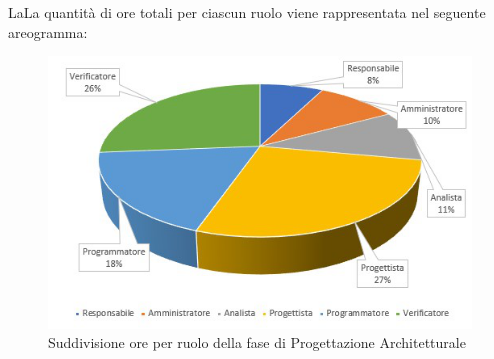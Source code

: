 LaLa quantità di ore totali per ciascun ruolo viene rappresentata nel seguente areogramma:
\begin{figure}[h!]
	\centering
	\includegraphics[scale=2.5]{Sezioni/Aerogrammi/AerogrammaProgettArchitetturale.png}
	\caption{Suddivisione ore per ruolo della fase di Progettazione Architetturale}
\end{figure}